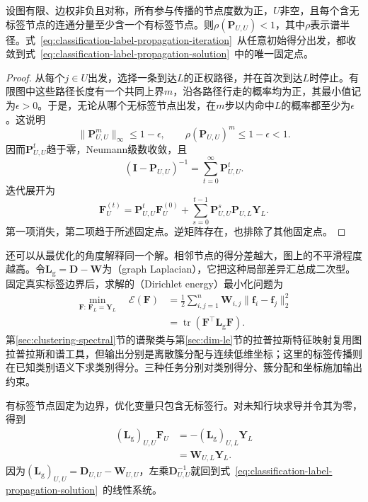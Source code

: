 \begin{theorem}[硬钳制传播的唯一解]
  \label{thm:classification-label-propagation-convergence}
  设图有限、边权非负且对称，所有参与传播的节点度数为正，$U$非空，且每个含无标签节点的连通分量至少含一个有标签节点。则$\rho(\bm{P}_{U,U})<1$，其中$\rho$表示谱半径。式~\eqref{eq:classification-label-propagation-iteration}~从任意初始得分出发，都收敛到式~\eqref{eq:classification-label-propagation-solution}~中的唯一固定点。
\end{theorem}

\begin{proof}
  从每个$j\in U$出发，选择一条到达$L$的正权路径，并在首次到达$L$时停止。有限图中这些路径长度有一个共同上界$m$，沿各路径行走的概率均为正，其最小值记为$\epsilon>0$。于是，无论从哪个无标签节点出发，在$m$步以内命中$L$的概率都至少为$\epsilon$。这说明
  \[
    \lVert\bm{P}_{U,U}^{m}\rVert_\infty\leq1-\epsilon,
    \qquad
    \rho(\bm{P}_{U,U})^m\leq1-\epsilon<1.
  \]
  因而$\bm{P}_{U,U}^t$趋于零，Neumann级数收敛，且
  \[
    (\bm{I}-\bm{P}_{U,U})^{-1}
      =\sum_{t=0}^{\infty}\bm{P}_{U,U}^{t}.
  \]
  迭代展开为
  \[
    \bm{F}_U^{(t)}
      =\bm{P}_{U,U}^{t}\bm{F}_U^{(0)}
       +\sum_{s=0}^{t-1}
         \bm{P}_{U,U}^{s}\bm{P}_{U,L}\bm{Y}_L.
  \]
  第一项消失，第二项趋于所述固定点。逆矩阵存在，也排除了其他固定点。
\end{proof}

还可以从最优化的角度解释同一个解。相邻节点的得分差越大，图上的不平滑程度越高。令$\bm{L}_{\mathrm{g}}=\bm{D}-\bm{W}$为（graph Laplacian），它把这种局部差异汇总成二次型。固定真实标签边界后，求解的（Dirichlet energy）最小化问题为
\begin{equation}
  \label{eq:classification-label-propagation-energy}
  \begin{aligned}
    \min_{\bm{F}:\,\bm{F}_L=\bm{Y}_L}\quad
    \mathcal{E}(\bm{F})
      &=\frac12\sum_{i,j=1}^{n}
        \bm{W}_{i,j}\lVert\bm{f}_i-\bm{f}_j\rVert_2^2\\
      &=\operatorname{tr}
        (\bm{F}^{\top}\bm{L}_{\mathrm{g}}\bm{F}).
  \end{aligned}
\end{equation}
第\ref{sec:clustering-spectral}节的谱聚类与第\ref{sec:dim-le}节的拉普拉斯特征映射复用图拉普拉斯和谱工具，但输出分别是离散簇分配与连续低维坐标；这里的标签传播则在已知类别语义下求类别得分。三种任务分别对类别得分、簇分配和坐标施加输出约束。

有标签节点固定为边界，优化变量只包含无标签行。对未知行块求导并令其为零，得到
\begin{equation}
  \label{eq:classification-label-propagation-dirichlet}
  \begin{aligned}
    (\bm{L}_{\mathrm{g}})_{U,U}\bm{F}_U
      &=-(\bm{L}_{\mathrm{g}})_{U,L}\bm{Y}_L\\
      &=\bm{W}_{U,L}\bm{Y}_L.
  \end{aligned}
\end{equation}
因为$(\bm{L}_{\mathrm{g}})_{U,U}=\bm{D}_{U,U}-\bm{W}_{U,U}$，左乘$\bm{D}_{U,U}^{-1}$就回到式~\eqref{eq:classification-label-propagation-solution}~的线性系统。

